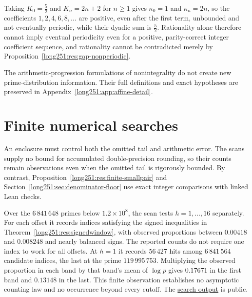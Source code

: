 \documentclass[11pt]{article}
\begin{document}
\noindent Taking $K_0=\tfrac52$ and $K_n=2n+2$ for $n\ge1$ gives
$\kappa_0=1$ and $\kappa_n=2n$, so the coefficients $1,2,4,6,8,\ldots$ are
positive, even after the first term, unbounded and not eventually periodic,
while their dyadic sum is $\tfrac52$.  Rationality alone therefore cannot imply
eventual periodicity even for a positive, parity-correct integer coefficient
sequence, and rationality cannot be contradicted merely by
Proposition~\ref{long251:res:gap-nonperiodic}.

The arithmetic-progression formulations of nonintegrality do not create new
prime-distribution information.  Their full definitions and exact
hypotheses are preserved in Appendix~\ref{long251:app:affine-detail}.

\section{Finite numerical searches}\label{long251:sec:measurements}

An enclosure must control both the omitted tail and arithmetic error.
The scans supply no bound for accumulated double-precision rounding, so
their counts remain observations even when the omitted tail is rigorously
bounded.  By contrast, Proposition~\ref{long251:res:finite-smallpair} and
Section~\ref{long251:sec:denominator-floor} use exact integer comparisons
with linked Lean checks.

Over the $6\,841\,648$ primes below $1.2\times10^{8}$, the scan tests
$h=1,\ldots,16$ separately.  For each offset it records indices satisfying
the signed inequalities in Theorem~\ref{long251:res:signedwindow}, with
observed proportions between $0.00418$ and $0.008248$ and nearly balanced
signs.  The reported counts do not require one index to work for all offsets.  At $h=1$ it records $56\,427$ hits among $6\,841\,564$ candidate
indices, the last at the prime $119\,995\,753$.  Multiplying the observed proportion in each band
by that band's mean of $\log p$ gives $0.17671$ in the first band and
$0.13148$ in the last.
This finite observation establishes no asymptotic counting law and no
occurrence beyond every cutoff.  The
\href{https://github.com/wcook04/plectis-erdos/blob/dd6cc708f650f061de06594eba6ba43878f4de31/research/experiments/erdos251/receipts/adjacent-mismatch.json}{search output}
is public.
\end{document}
